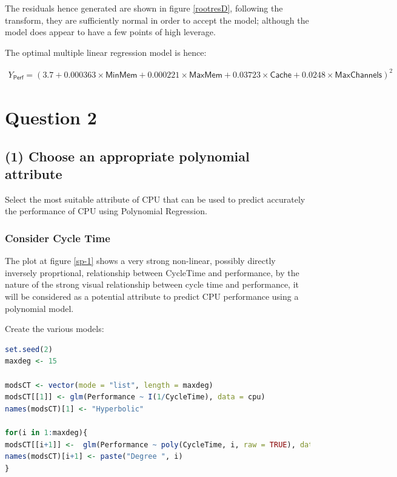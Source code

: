 \documentclass[
]{article}
\begin{document}
The residuals hence generated are shown in figure \ref{rootresD}, following the transform, they are sufficiently normal in order
to accept the model; although the model does appear to have a few points of
high leverage.

The optimal multiple linear regression model is hence:

{ \small
\begin{align}
Y_{\textsf{Perf}} = \left( 3.7 + 0.000363 \times \textsf{MinMem}  + 0.000221 \times \textsf{MaxMem} + 0.03723 \times \textsf{Cache} + 0.0248 \times \textsf{MaxChannels} \right)^2 \label{bestMultTrans}
\end{align}
}

\newpage

\hypertarget{question-2}{%
\section{Question 2}\label{question-2}}

\hypertarget{choose-an-appropriate-polynomial-attribute}{%
\subsection{(1) Choose an appropriate polynomial
attribute}\label{choose-an-appropriate-polynomial-attribute}}

Select the most suitable attribute of CPU that can be used to predict
accurately the performance of CPU using Polynomial Regression.

\hypertarget{consider-cycle-time}{%
\subsubsection{Consider Cycle Time}\label{consider-cycle-time}}

The plot at figure \ref{sp-1} shows a very strong non-linear, possibly
directly inversely proprtional, relationship between CycleTime and
performance, by the nature of the strong visual relationship between cycle time and
performance, it will be considered as a potential attribute to predict
CPU performance using a polynomial model.

Create the various models:

\begin{lstlisting}[language=R]
set.seed(2)
maxdeg <- 15

modsCT <- vector(mode = "list", length = maxdeg)
modsCT[[1]] <- glm(Performance ~ I(1/CycleTime), data = cpu)
names(modsCT)[1] <- "Hyperbolic"

for(i in 1:maxdeg){
modsCT[[i+1]] <-  glm(Performance ~ poly(CycleTime, i, raw = TRUE), data = cpu)
names(modsCT)[i+1] <- paste("Degree ", i)
}
\end{lstlisting}
\end{document}
